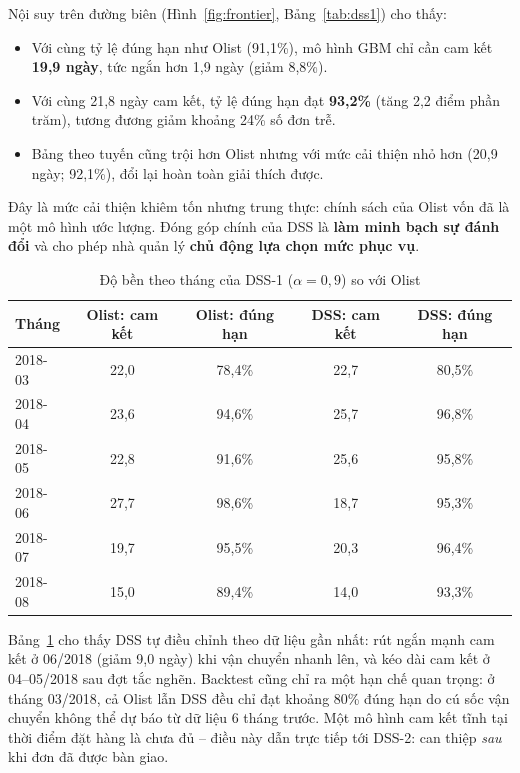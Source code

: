 \documentclass[a4paper]{article}
\newcommand{\thead}[1]{\textbf{#1}}
\begin{document}
Nội suy trên đường biên (Hình~\ref{fig:frontier}, Bảng~\ref{tab:dss1}) cho thấy:
\begin{itemize}
    \item Với cùng tỷ lệ đúng hạn như Olist (91,1\%), mô hình GBM chỉ cần cam kết \textbf{19,9 ngày}, tức ngắn hơn 1,9 ngày (giảm 8,8\%).
    \item Với cùng 21,8 ngày cam kết, tỷ lệ đúng hạn đạt \textbf{93,2\%} (tăng 2,2 điểm phần trăm), tương đương giảm khoảng 24\% số đơn trễ.
    \item Bảng theo tuyến cũng trội hơn Olist nhưng với mức cải thiện nhỏ hơn (20,9 ngày; 92,1\%), đổi lại hoàn toàn giải thích được.
\end{itemize}
Đây là mức cải thiện khiêm tốn nhưng trung thực: chính sách của Olist vốn đã là một mô hình ước lượng. Đóng góp chính của DSS là \textbf{làm minh bạch sự đánh đổi} và cho phép nhà quản lý \textbf{chủ động lựa chọn mức phục vụ}.

\begin{table}[!htbp]
\centering
\caption{Độ bền theo tháng của DSS-1 ($\alpha = 0{,}9$) so với Olist}
\label{tab:dss1-monthly}
\small
\begin{tabular}{@{}l c c c c@{}}
\toprule
\thead{Tháng} & \thead{Olist: cam kết} & \thead{Olist: đúng hạn} & \thead{DSS: cam kết} & \thead{DSS: đúng hạn} \\
\midrule
2018-03 & 22,0 & 78,4\% & 22,7 & 80,5\% \\
2018-04 & 23,6 & 94,6\% & 25,7 & 96,8\% \\
2018-05 & 22,8 & 91,6\% & 25,6 & 95,8\% \\
2018-06 & 27,7 & 98,6\% & 18,7 & 95,3\% \\
2018-07 & 19,7 & 95,5\% & 20,3 & 96,4\% \\
2018-08 & 15,0 & 89,4\% & 14,0 & 93,3\% \\
\bottomrule
\end{tabular}
\end{table}

Bảng~\ref{tab:dss1-monthly} cho thấy DSS tự điều chỉnh theo dữ liệu gần nhất: rút ngắn mạnh cam kết ở 06/2018 (giảm 9,0 ngày) khi vận chuyển nhanh lên, và kéo dài cam kết ở 04--05/2018 sau đợt tắc nghẽn. Backtest cũng chỉ ra một hạn chế quan trọng: ở tháng 03/2018, cả Olist lẫn DSS đều chỉ đạt khoảng 80\% đúng hạn do cú sốc vận chuyển không thể dự báo từ dữ liệu 6 tháng trước. Một mô hình cam kết tĩnh tại thời điểm đặt hàng là chưa đủ -- điều này dẫn trực tiếp tới DSS-2: can thiệp \textit{sau} khi đơn đã được bàn giao.
\end{document}
